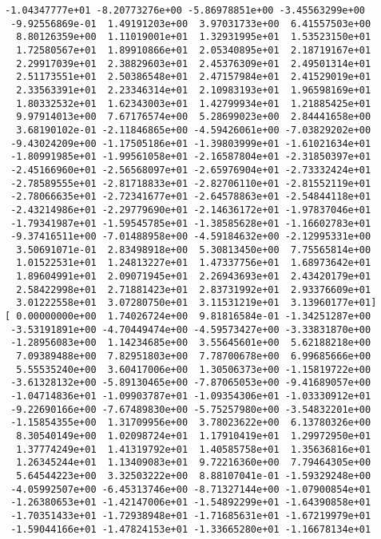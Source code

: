 \documentclass[11pt]{article}
\begin{document}
\begin{Verbatim}[commandchars=\\\{\}]
 -1.04347777e+01 -8.20773276e+00 -5.86978851e+00 -3.45563299e+00
 -9.92556869e-01  1.49191203e+00  3.97031733e+00  6.41557503e+00
  8.80126359e+00  1.11019001e+01  1.32931995e+01  1.53523150e+01
  1.72580567e+01  1.89910866e+01  2.05340895e+01  2.18719167e+01
  2.29917039e+01  2.38829603e+01  2.45376309e+01  2.49501314e+01
  2.51173551e+01  2.50386548e+01  2.47157984e+01  2.41529019e+01
  2.33563391e+01  2.23346314e+01  2.10983193e+01  1.96598169e+01
  1.80332532e+01  1.62343003e+01  1.42799934e+01  1.21885425e+01
  9.97914013e+00  7.67176574e+00  5.28699023e+00  2.84441658e+00
  3.68190102e-01 -2.11846865e+00 -4.59426061e+00 -7.03829202e+00
 -9.43024209e+00 -1.17505186e+01 -1.39803999e+01 -1.61021634e+01
 -1.80991985e+01 -1.99561058e+01 -2.16587804e+01 -2.31850397e+01
 -2.45166960e+01 -2.56568097e+01 -2.65976904e+01 -2.73332424e+01
 -2.78589555e+01 -2.81718833e+01 -2.82706110e+01 -2.81552119e+01
 -2.78066635e+01 -2.72341677e+01 -2.64578863e+01 -2.54844118e+01
 -2.43214986e+01 -2.29779690e+01 -2.14636172e+01 -1.97837046e+01
 -1.79341987e+01 -1.59545785e+01 -1.38585628e+01 -1.16602783e+01
 -9.37416511e+00 -7.01488958e+00 -4.59184632e+00 -2.12995331e+00
  3.50691071e-01  2.83498918e+00  5.30813450e+00  7.75565814e+00
  1.01522531e+01  1.24813227e+01  1.47337756e+01  1.68973642e+01
  1.89604991e+01  2.09071945e+01  2.26943693e+01  2.43420179e+01
  2.58422998e+01  2.71881423e+01  2.83731992e+01  2.93376609e+01
  3.01222558e+01  3.07280750e+01  3.11531219e+01  3.13960177e+01]
[ 0.00000000e+00  1.74026724e+00  9.81816584e-01 -1.34251287e+00
 -3.53191891e+00 -4.70449474e+00 -4.59573427e+00 -3.33831870e+00
 -1.28956083e+00  1.14234685e+00  3.55645601e+00  5.62188218e+00
  7.09389488e+00  7.82951803e+00  7.78700678e+00  6.99685666e+00
  5.55535240e+00  3.60417006e+00  1.30506373e+00 -1.15819722e+00
 -3.61328132e+00 -5.89130465e+00 -7.87065053e+00 -9.41689057e+00
 -1.04714836e+01 -1.09903787e+01 -1.09354306e+01 -1.03330912e+01
 -9.22690166e+00 -7.67489830e+00 -5.75257980e+00 -3.54832201e+00
 -1.15854355e+00  1.31709956e+00  3.78023622e+00  6.13780326e+00
  8.30540149e+00  1.02098724e+01  1.17910419e+01  1.29972950e+01
  1.37774249e+01  1.41319792e+01  1.40585758e+01  1.35636816e+01
  1.26345244e+01  1.13409083e+01  9.72216360e+00  7.79464305e+00
  5.64544223e+00  3.32503222e+00  8.88107041e-01 -1.59329248e+00
 -4.05992507e+00 -6.45313746e+00 -8.71327144e+00 -1.07900854e+01
 -1.26380653e+01 -1.42147006e+01 -1.54892299e+01 -1.64390858e+01
 -1.70351433e+01 -1.72938948e+01 -1.71685631e+01 -1.67219979e+01
 -1.59044166e+01 -1.47824153e+01 -1.33665280e+01 -1.16678134e+01

\end{Verbatim}
\end{document}
